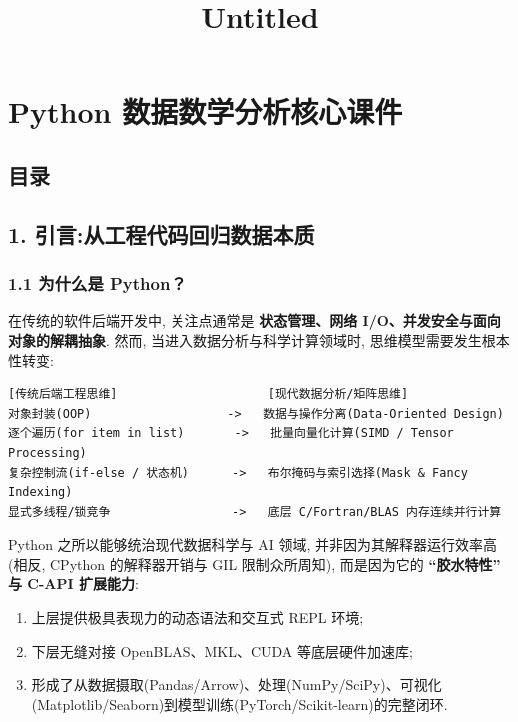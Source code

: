 \documentclass[11pt]{article}
\title{Untitled}
\providecommand{\tightlist}{%
      \setlength{\itemsep}{0pt}\setlength{\parskip}{0pt}}
\begin{document}
    
    \maketitle
    
    

    
    \section{Python
数据数学分析核心课件}\label{python-ux6570ux636eux6570ux5b66ux5206ux6790ux6838ux5fc3ux8bfeux4ef6}

\subsection{目录}\label{ux76eeux5f55}

\subsection{1.
引言:从工程代码回归数据本质}\label{ux5f15ux8a00ux4eceux5de5ux7a0bux4ee3ux7801ux56deux5f52ux6570ux636eux672cux8d28}

\subsubsection{1.1 为什么是
Python？}\label{ux4e3aux4ec0ux4e48ux662f-python}

在传统的软件后端开发中, 关注点通常是 \textbf{状态管理、网络
I/O、并发安全与面向对象的解耦抽象}. 然而,
当进入数据分析与科学计算领域时, 思维模型需要发生根本性转变:

\begin{verbatim}
[传统后端工程思维]                     [现代数据分析/矩阵思维]
对象封装(OOP)                   ->   数据与操作分离(Data-Oriented Design)
逐个遍历(for item in list)       ->   批量向量化计算(SIMD / Tensor Processing)
复杂控制流(if-else / 状态机)      ->   布尔掩码与索引选择(Mask & Fancy Indexing)
显式多线程/锁竞争                 ->   底层 C/Fortran/BLAS 内存连续并行计算
\end{verbatim}

Python 之所以能够统治现代数据科学与 AI 领域,
并非因为其解释器运行效率高(相反, CPython 的解释器开销与 GIL
限制众所周知), 而是因为它的 \textbf{``胶水特性'' 与 C-API 扩展能力}:

\begin{enumerate}
\def\labelenumi{\arabic{enumi}.}
\tightlist
\item
  上层提供极具表现力的动态语法和交互式 REPL 环境;
\item
  下层无缝对接 OpenBLAS、MKL、CUDA 等底层硬件加速库;
\item
  形成了从数据摄取(Pandas/Arrow)、处理(NumPy/SciPy)、可视化(Matplotlib/Seaborn)到模型训练(PyTorch/Scikit-learn)的完整闭环.
\end{enumerate}
\end{document}
